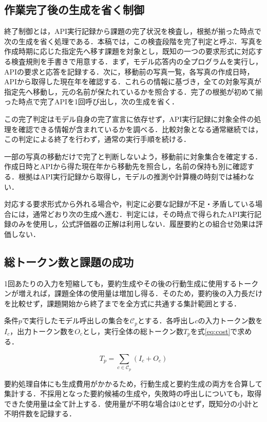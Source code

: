 \documentclass[letter]{ieicej}
\begin{document}
\subsection{作業完了後の生成を省く制御}

終了制御とは，API実行記録から課題の完了状況を検査し，根拠が揃った時点で次の生成を省く処理である．本稿では，この検査段階を完了判定と呼ぶ．写真を作成時期に応じた指定先へ移す課題を対象とし，既知の一つの要求形式に対応する検査規則を手書きで用意する．まず，モデル応答内の全プログラムを実行し，APIの要求と応答を記録する．次に，移動前の写真一覧，各写真の作成日時，APIから取得した現在年を確認する．これらの情報に基づき，全ての対象写真が指定先へ移動し，元の名前が保たれているかを照合する．完了の根拠が初めて揃った時点で完了APIを1回呼び出し，次の生成を省く．

この完了判定はモデル自身の完了宣言に依存せず，API実行記録に対象全件の処理を確認できる情報が含まれているかを調べる．比較対象となる通常継続では，この判定による終了を行わず，通常の実行手順を続ける．

一部の写真の移動だけで完了と判断しないよう，移動前に対象集合を確定する．作成日時とAPIから得た現在年から移動先を照合し，名前の保持も別に確認する．根拠はAPI実行記録から取得し，モデルの推測や計算機の時刻では補わない．

対応する要求形式から外れる場合や，判定に必要な記録が不足・矛盾している場合には，通常どおり次の生成へ進む．判定には，その時点で得られたAPI実行記録のみを使用し，公式評価器の正解は利用しない．履歴要約との組合せ効果は評価しない．

\subsection{総トークン数と課題の成功}

1回あたりの入力を短縮しても，要約生成やその後の行動生成に使用するトークンが増えれば，課題全体の使用量は増加し得る．そのため，要約後の入力長だけを比較せず，課題開始から終了までを全方式に共通する集計範囲とする．

\par\noindent\begin{minipage}{\columnwidth}
\setlength{\abovedisplayskip}{4pt}\setlength{\belowdisplayskip}{4pt}
条件$p$で実行したモデル呼出しの集合を$\mathcal C_p$とする．各呼出し$c$の入力トークン数を$I_c$，出力トークン数を$O_c$とし，実行全体の総トークン数$T_p$を\mbox{式\eqref{eq:cost}で求める．}

\begin{equation}
 T_p=\sum_{c\in\mathcal C_p}(I_c+O_c)
 \label{eq:cost}
\end{equation}

要約処理自体にも生成費用がかかるため，行動生成と要約生成の両方を合算して集計する．不採用となった要約候補の生成や，失敗時の呼出しについても，取得できた使用量は全て計上する．使用量が不明な場合は0とせず，既知分の小計と不明件数を記録する．

\end{minipage}\par{}
\end{document}
